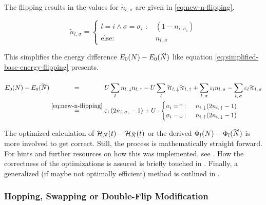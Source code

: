 The flipping results in the values for $\tilde{n}_{l,\,\sigma}$ are given in \autoref{eq:new-n-flipping}.

\begin{equation}
    \label{eq:new-n-flipping}
    \tilde{n}_{l,\,\sigma} = \begin{cases}
        l = i \land \sigma = \sigma_i\text{ : }  &  (1 - n_{i,\,\sigma_i})  \\
        \text{else: }   &    n_{l,\,\sigma} 
    \end{cases}
\end{equation}

This simplifies the energy difference $E_0(N)-E_0(\vphantom{N}\smash{\tilde{N}})$ like equation \autoref{eq:simplified-base-energy-flipping} presents.

\begin{equation}
    \label{eq:simplified-base-energy-flipping}
    \begin{split}
        E_0(N)-E_0(\vphantom{N}\smash{\tilde{N}}) 
        &\stackrel{\phantom{\ref{eq:new-n-flipping}}}{=} U\lsum n_{l,\,\down}n_{l,\,\up}-U\lsum \tilde{n}_{l,\,\down}\tilde{n}_{l,\,\up} 
        + \lsum[l,\,\sigma] \epsl n_{l,\,\sigma} - \lsum[l,\,\sigma] \epsl \tilde{n}_{l,\,\sigma}\\
        &\stackrel{\ref{eq:new-n-flipping}}{=} \epsl[i] \left(2 n_{i,\,\sigma_i} - 1\right) +
        U\cdot \begin{cases}
            \sigma_i = \,\up\text{: }   & n_{i,\,\down} (2 n_{i,\,\up} - 1)\\
            \sigma_i = \,\down\text{: } & n_{i,\,\up} (2 n_{i,\,\down} - 1)  
        \end{cases}
    \end{split}
\end{equation}

The optimized calculation of $\HNOft - \HNOft[\vphantom{N}\smash{\tilde{N}}]$ or the derived $\Phi_l(N) - \Phi_l(\vphantom{N}\smash{\tilde{N}})$ is more involved to get correct.
Still, the process is mathematically straight forward. 
For hints and further resources on how this was implemented, see .
How the correctness of the optimizations is assured is briefly touched in .
Finally, a generalized (if maybe not optimally efficient) method is outlined in .

\subsubsection*{Hopping, Swapping or Double-Flip Modification}
\label{sec:theory-optimization-hopping}

